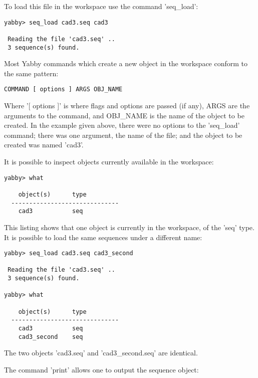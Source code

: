 
To load this file in the workspace use the command 'seq\_load':

\begin{verbatim}
yabby> seq_load cad3.seq cad3

 Reading the file 'cad3.seq' ..
 3 sequence(s) found.
\end{verbatim}

Most Yabby commands which create a new object in the workspace
conform to the same pattern:

\begin{verbatim}
COMMAND [ options ] ARGS OBJ_NAME
\end{verbatim}

Where '[ options ]' is where flags and options are passed (if
any), ARGS are the arguments to the command, and OBJ\_NAME is
the name of the object to be created. In the example given
above, there were no options to the 'seq\_load' command; there
was one argument, the name of the file; and the object to be
created was named 'cad3'.

It is possible to inspect objects currently available in the
workspace:


\begin{verbatim}
yabby> what

    object(s)      type
  ------------------------------
    cad3           seq           
\end{verbatim}

This listing shows that one object is currently in the workspace,
of the 'seq' type. It is possible to load the same sequences
under a different name: 

\begin{verbatim}
yabby> seq_load cad3.seq cad3_second

 Reading the file 'cad3.seq' ..
 3 sequence(s) found.

yabby> what

    object(s)      type
  ------------------------------
    cad3           seq           
    cad3_second    seq           
\end{verbatim}

The two objects 'cad3.seq' and 'cad3\_second.seq' are identical.


The command 'print' allows one to output the sequence object:

